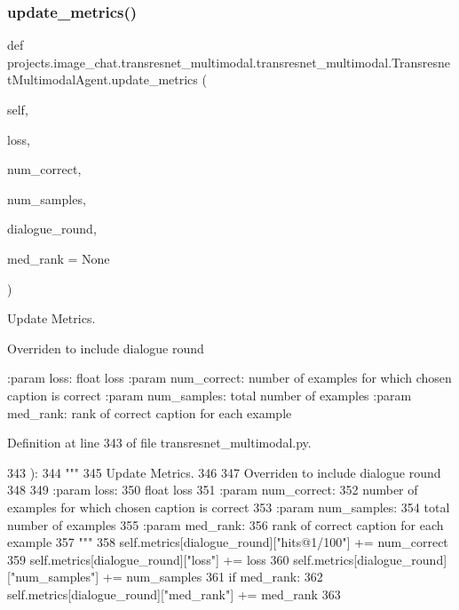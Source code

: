 \subsubsection{\texorpdfstring{update\+\_\+metrics()}{update\_metrics()}}
{\footnotesize\ttfamily def projects.\+image\+\_\+chat.\+transresnet\+\_\+multimodal.\+transresnet\+\_\+multimodal.\+Transresnet\+Multimodal\+Agent.\+update\+\_\+metrics (\begin{DoxyParamCaption}\item[{}]{self,  }\item[{}]{loss,  }\item[{}]{num\+\_\+correct,  }\item[{}]{num\+\_\+samples,  }\item[{}]{dialogue\+\_\+round,  }\item[{}]{med\+\_\+rank = {\ttfamily None} }\end{DoxyParamCaption})}

\begin{DoxyVerb}Update Metrics.

Overriden to include dialogue round

:param loss:
    float loss
:param num_correct:
    number of examples for which chosen caption is correct
:param num_samples:
    total number of examples
:param med_rank:
    rank of correct caption for each example
\end{DoxyVerb}
 

Definition at line 343 of file transresnet\+\_\+multimodal.\+py.


\begin{DoxyCode}
343     ):
344         \textcolor{stringliteral}{"""}
345 \textcolor{stringliteral}{        Update Metrics.}
346 \textcolor{stringliteral}{}
347 \textcolor{stringliteral}{        Overriden to include dialogue round}
348 \textcolor{stringliteral}{}
349 \textcolor{stringliteral}{        :param loss:}
350 \textcolor{stringliteral}{            float loss}
351 \textcolor{stringliteral}{        :param num\_correct:}
352 \textcolor{stringliteral}{            number of examples for which chosen caption is correct}
353 \textcolor{stringliteral}{        :param num\_samples:}
354 \textcolor{stringliteral}{            total number of examples}
355 \textcolor{stringliteral}{        :param med\_rank:}
356 \textcolor{stringliteral}{            rank of correct caption for each example}
357 \textcolor{stringliteral}{        """}
358         self.metrics[dialogue\_round][\textcolor{stringliteral}{"hits@1/100"}] += num\_correct
359         self.metrics[dialogue\_round][\textcolor{stringliteral}{"loss"}] += loss
360         self.metrics[dialogue\_round][\textcolor{stringliteral}{"num\_samples"}] += num\_samples
361         \textcolor{keywordflow}{if} med\_rank:
362             self.metrics[dialogue\_round][\textcolor{stringliteral}{"med\_rank"}] += med\_rank
363 
\end{DoxyCode}


